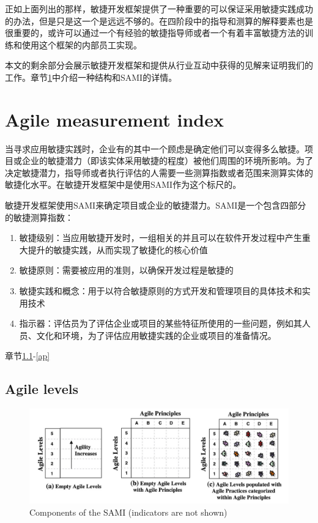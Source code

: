 \documentclass[twocolumn]{svjour3}[]
\begin{document}
正如上面列出的那样，敏捷开发框架提供了一种重要的可以保证采用敏捷实践成功的办法，但是只是这一个是远远不够的。在四阶段中的指导和测算的解释要素也是很重要的，或许可以通过一个有经验的敏捷指导师或者一个有着丰富敏捷方法的训练和使用这个框架的内部员工实现。

本文的剩余部分会展示敏捷开发框架和提供从行业互动中获得的见解来证明我们的工作。章节\ref{ami}中介绍一种结构和SAMI的详情。

\section{Agile measurement index}
\label{ami}

当寻求应用敏捷实践时，企业有的其中一个顾虑是确定他们可以变得多么敏捷\cite{sidky2007disciplined}。项目或企业的敏捷潜力（即该实体采用敏捷的程度）被他们周围的环境所影响。为了决定敏捷潜力，指导师或者执行评估的人需要一些测算指数或者范围来测算实体的敏捷化水平。在敏捷开发框架中是使用SAMI作为这个标尺的。

敏捷开发框架使用SAMI来确定项目或企业的敏捷潜力。SAMI是一个包含四部分的敏捷测算指数：

\begin{enumerate}
    \item 敏捷级别：当应用敏捷开发时，一组相关的并且可以在软件开发过程中产生重大提升的敏捷实践，从而实现了敏捷化的核心价值
    \item 敏捷原则：需要被应用的准则，以确保开发过程是敏捷的
    \item 敏捷实践和概念：用于以符合敏捷原则的方式开发和管理项目的具体技术和实用技术
    \item 指示器：评估员为了评估企业或项目的某些特征所使用的一些问题，例如其人员、文化和环境，为了评估应用敏捷实践的企业或项目的准备情况。
\end{enumerate}

章节\ref{al}-\ref{ap}

\subsection{Agile levels}
\label{al}

\begin{figure} [htb]
    \centering
    \includegraphics[width=1.0\textwidth]{img/sami-components.jpg}
    \caption{Components of the SAMI (indicators are not shown)}
    \label{sami-com}
\end{figure}
\end{document}
